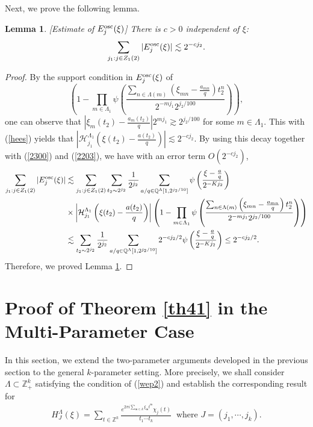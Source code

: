 \documentclass[11 pt,letterpaper]{amsart}
\theoremstyle{plain}
\newtheorem{lemma}{Lemma}\numberwithin{lemma}{section}
\theoremstyle{definition}
\theoremstyle{remark} \theoremstyle{exam} \theoremstyle{ob}
\numberwithin{equation}{section}
\begin{document}
Next, we prove the following lemma.
\begin{lemma}\label{lem574}[Estimate of $E^{\rm{osc}}_j(\xi)$]  There is $c>0$ independent of $\xi$:
$$\sum_{j_1:j\in Z_1(2)} |E^{\rm{osc}}_j(\xi)|\lesssim 2^{-cj_2}.$$
\end{lemma}
\begin{proof}
By  the support condition in  $E^{\rm{osc}}_j(\xi) $ of
$$\left( 1- \prod_{m\in\Lambda_1}\psi\left( \frac{\sum_{n\in\Lambda(m)}\left( \xi_{mn}-\frac{a_{mn}}{q} \right)t_2^n }{2^{-mj_1} 2^{ j_2/100}} \right) \right),$$
one can observe that $  \left|\xi_m(t_2)-\frac{a_m(t_2)}{q}\right|2^{m j_1} \gtrsim 2^{j_2/100}  $ for some $m\in\Lambda_1$. This with (\ref{hees}) yields that
$\left|  \mathcal{H}^{\Lambda_1}_{j_1}\left(\xi(t_2)-\frac{a(t_2)}{q}\right)\right|\lesssim 2^{-cj_2} . $
By using this decay together with  (\ref{2300}) and (\ref{2203}),  we have with an error term $O(2^{-cj_2})$,
\begin{align*} 
\sum_{j_1:j\in Z_1(2)} |E^{\rm{osc}}_{j}(\xi)|
 &\lesssim \sum_{j_1:j\in Z_1(2)} \sum_{t_2\sim 2^{j_2}} \frac{1}{2^{j_2}} \sum_{ a/q\in \mathbb{Q}^{\Lambda}[1,2^{j_2/10}]}   \psi\left(\frac{\xi-\frac{a}{q}}{2^{-Kj_2}}\right)\\
&\times \left| \mathcal{H}^{\Lambda_1}_{j_1}\left(\xi(t_2)-\frac{a(t_2)}{q}\right)\right|\left( 1- \prod_{m\in\Lambda_1}\psi\left( \frac{\sum_{n\in\Lambda(m)}\left( \xi_{mn}-\frac{a_{mn}}{q} \right)t_2^n }{2^{-mj_1} 2^{ j_2/100}} \right) \right)\nonumber\\
&
\lesssim  \sum_{t_2\sim 2^{j_2}} \frac{1}{2^{j_2}} \sum_{ a/q\in \mathbb{Q}^{\Lambda}[1,2^{j_2/10}]}  2^{-cj_2/2}\psi\left(\frac{\xi-\frac{a}{q}}{2^{-Kj_2}}\right)  \le 2^{-cj_2/2}.
\end{align*}
Therefore, we proved Lemma \ref{lem574}.
\end{proof}







\section{Proof of Theorem \ref{th41} in the  Multi-Parameter Case}\label{sec5}
In this section, we extend the two-parameter arguments developed in the previous section to the general $k$-parameter setting. More precisely, we shall consider $\Lambda \subset \mathbb{Z}_{+}^k$ satisfying the condition of (\ref{wep2}) and   establish the corresponding result for
\begin{align*} 
	H^{\Lambda}_J(\xi)= \sum_{t\in \mathbb{Z}^k}  \frac{e^{2\pi i \sum_{\mathfrak{m}\in\Lambda} \xi_{\mathfrak{m}} t^{\mathfrak{m}}}\chi_j(t)}{t_1\cdots t_k} \ \text{ where $J=(j_1,\cdots,j_k)$}.
\end{align*}  
\end{document}
